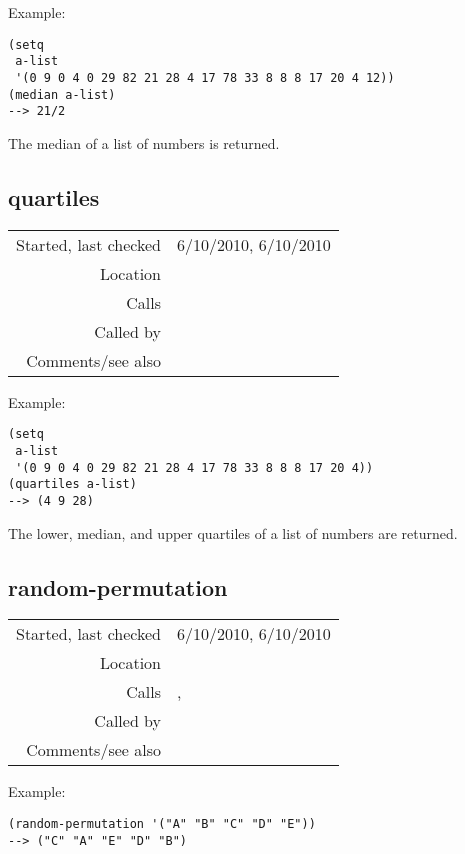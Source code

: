 \vspace{0.5cm}
\noindent Example:
\begin{verbatim}
(setq
 a-list
 '(0 9 0 4 0 29 82 21 28 4 17 78 33 8 8 8 17 20 4 12))
(median a-list)
--> 21/2
\end{verbatim}

\noindent The median of a list of numbers is
returned.


\subsection*{quartiles}\label{fun:quartiles}

\vspace{0.3cm}
\begin{tabular}{r|p{8cm}}
Started, last checked & 6/10/2010, 6/10/2010 \\
Location & \nameref{sec:stats-sampling} \\
Calls & \nameref{fun:median} \\
Called by & \\
Comments/see also & 
\end{tabular}

\vspace{0.5cm}
\noindent Example:
\begin{verbatim}
(setq
 a-list
 '(0 9 0 4 0 29 82 21 28 4 17 78 33 8 8 8 17 20 4))
(quartiles a-list)
--> (4 9 28)
\end{verbatim}

\noindent The lower, median, and upper quartiles of a
list of numbers are returned.


\subsection*{random-permutation}\label{fun:random-permutation}

\vspace{0.3cm}
\begin{tabular}{r|p{8cm}}
Started, last checked & 6/10/2010, 6/10/2010 \\
Location & \nameref{sec:stats-sampling} \\
Calls & \nameref{fun:nth-list}, \nameref{fun:sample-integers-no-replacement} \\
Called by & \\
Comments/see also & 
\end{tabular}

\vspace{0.5cm}
\noindent Example:
\begin{verbatim}
(random-permutation '("A" "B" "C" "D" "E"))
--> ("C" "A" "E" "D" "B")
\end{verbatim}

